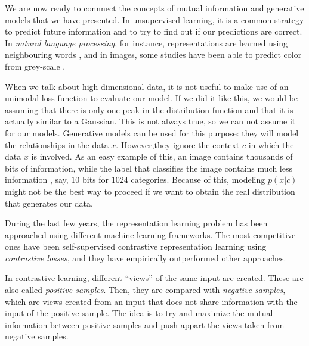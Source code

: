 

We are now ready to connnect the concepts of mutual information and generative models that we have presented. In unsupervised learning,
it is a common strategy to predict future information and to try to find out if our predictions are correct.
In \emph{natural language processing}, for instance, representations are learned 
using neighbouring words \citep{mikolov_efficient_2013}, and in images, some studies have been able to predict color from grey-scale \citep{doersch_unsupervised_2016}.

When we talk about high-dimensional data, it is not useful to make use of an unimodal loss function to evaluate our model. If we did it like this, we would be assuming that there is only
one peak in the distribution function and that it is actually similar to a Gaussian.  This is not always true, so we can not assume it for our models. Generative models can be used for this purpose:
they will model the relationships in the data $x$. However,they ignore the context $c$ in which the data $x$ is involved. As an easy example of this, an image contains thousands of bits of information,
while the label that classifies the image contains much less information , say, $10$ bits for $1024$ categories. Because of this, modeling $p(x|c)$ might not be the best way to proceed if we want
to obtain the real distribution that generates our data. 

During the last few years, the representation learning problem has been approached using different machine learning frameworks. The most competitive ones have been self-supervised contrastive representation learning \cite{oord_representation_2019,tian_what_2020,hjelm_learning_2019,gutmann_noise-contrastive_nodate,chen_simple_2020,he_momentum_2020} using \emph{contrastive losses}, and they have empirically outperformed other approaches.     

In contrastive learning, different ``views'' of the same input are created. These are also called \emph{positive samples}. Then, they are compared with \emph{negative samples}, which are views created from an input that does not share information with the input of the positive sample. The idea is to try and maximize the mutual information between positive samples and push appart the views taken from negative samples. 


